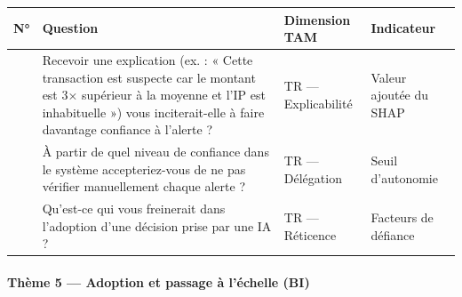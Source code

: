 \documentclass[
  12pt,
]{article}
\newcounter{none} %
\begin{document}
{\def\LTcaptype{none} %
\begin{longtable}[]{@{}
  >{\raggedright\arraybackslash}p{}
  >{\raggedright\arraybackslash}p{}
  >{\raggedright\arraybackslash}p{}
  >{\raggedright\arraybackslash}p{}@{}}
\toprule\noalign{}
\begin{minipage}[b]{\linewidth}\raggedright
N°
\end{minipage} & \begin{minipage}[b]{\linewidth}\raggedright
Question
\end{minipage} & \begin{minipage}[b]{\linewidth}\raggedright
Dimension TAM
\end{minipage} & \begin{minipage}[b]{\linewidth}\raggedright
Indicateur
\end{minipage} \\
\midrule\noalign{}
\endhead
\bottomrule\noalign{}
\endlastfoot
10 & Recevoir une explication (ex. : « Cette transaction est suspecte
car le montant est 3× supérieur à la moyenne et l’IP est inhabituelle »)
vous inciterait-elle à faire davantage confiance à l’alerte ? & TR —
Explicabilité & Valeur ajoutée du SHAP \\
11 & À partir de quel niveau de confiance dans le système
accepteriez-vous de ne pas vérifier manuellement chaque alerte ? & TR —
Délégation & Seuil d’autonomie \\
12 & Qu’est-ce qui vous freinerait dans l’adoption d’une décision prise
par une IA ? & TR — Réticence & Facteurs de défiance \\
\end{longtable}
}

\paragraph{Thème 5 — Adoption et passage à l’échelle
(BI)}\label{thuxe8me-5-adoption-et-passage-uxe0-luxe9chelle-bi}
\end{document}
